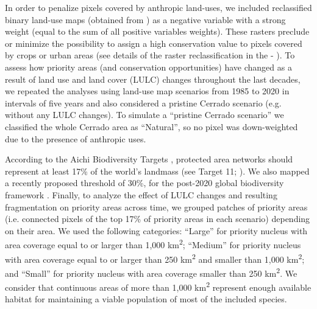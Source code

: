 \documentclass[12pt,openright,oneside,a4paper,english]{abntex2}
\begin{document}
In order to penalize pixels covered by anthropic land-uses, we included reclassified binary land-use maps (obtained from \citealp{MapBiomas2022}) as a negative variable with a strong weight (equal to the sum of all positive variables weights). These rasters preclude or minimize the possibility to assign a high conservation value to pixels covered by crops or urban areas (see details of the raster reclassification in the  - ). To assess how priority areas (and conservation opportunities) have changed as a result of land use and land cover (LULC) changes throughout the last decades, we repeated the analyses using land-use map scenarios from 1985 to 2020 \citep{MapBiomas2022} in intervals of five years and also considered a pristine Cerrado scenario (e.g. without any LULC changes). To simulate a “pristine Cerrado scenario” we classified the whole Cerrado area as “Natural”, so no pixel was down-weighted due to the presence of anthropic uses.

According to the Aichi Biodiversity Targets \citep{CBD2010}, protected area networks should represent at least 17\% of the world’s landmass (see Target 11; \citealp{CBD2010}). We also mapped a recently proposed threshold of 30\%, for the post-2020 global biodiversity framework \citep{Woodley2019}. Finally, to analyze the effect of LULC changes and resulting fragmentation on priority areas across time, we grouped patches of priority areas (i.e. connected pixels of the top 17\% of priority areas in each scenario) depending on their area. We used the following categories: “Large” for priority nucleus with area coverage equal to or larger than 1,000 km\textsuperscript{2}; “Medium” for priority nucleus with area coverage equal to or larger than 250 km\textsuperscript{2} and smaller than 1,000 km\textsuperscript{2}; and “Small” for priority nucleus with area coverage smaller than 250 km\textsuperscript{2}. We consider that continuous areas of more than 1,000 km\textsuperscript{2} represent enough available habitat for maintaining a viable population of most of the included species.



\end{document}
